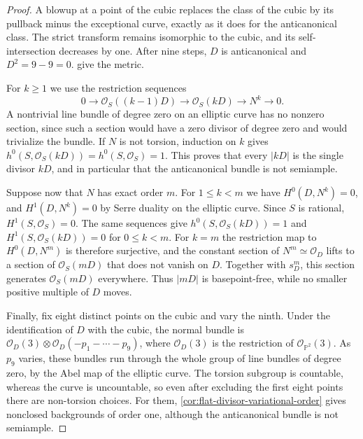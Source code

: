 \begin{proof}
A blowup at a point of the cubic replaces the class of the cubic by its pullback minus the exceptional curve, exactly as it does for the anticanonical class. The strict transform remains isomorphic to the cubic, and its self-intersection decreases by one. After nine steps, $D$ is anticanonical and $D^2=9-9=0$.  give the metric.

For $k\geq1$ we use the restriction sequences
\[
 0\longrightarrow\mathcal O_S((k-1)D)
 \longrightarrow\mathcal O_S(kD)
 \longrightarrow N^k\longrightarrow0.
\]
A nontrivial line bundle of degree zero on an elliptic curve has no nonzero section, since such a section would have a zero divisor of degree zero and would trivialize the bundle. If $N$ is not torsion, induction on $k$ gives $h^0(S,\mathcal O_S(kD))=h^0(S,\mathcal O_S)=1$. This proves that every $|kD|$ is the single divisor $kD$, and in particular that the anticanonical bundle is not semiample.

Suppose now that $N$ has exact order $m$. For $1\leq k<m$ we have $H^0(D,N^k)=0$, and $H^1(D,N^k)=0$ by Serre duality on the elliptic curve. Since $S$ is rational, $H^1(S,\mathcal O_S)=0$. The same sequences give $h^0(S,\mathcal O_S(kD))=1$ and $H^1(S,\mathcal O_S(kD))=0$ for $0\leq k<m$. For $k=m$ the restriction map to $H^0(D,N^m)$ is therefore surjective, and the constant section of $N^m\simeq\mathcal O_D$ lifts to a section of $\mathcal O_S(mD)$ that does not vanish on $D$. Together with $s_D^m$, this section generates $\mathcal O_S(mD)$ everywhere. Thus $|mD|$ is basepoint-free, while no smaller positive multiple of $D$ moves.

Finally, fix eight distinct points on the cubic and vary the ninth. Under the identification of $D$ with the cubic, the normal bundle is $\mathcal O_D(3)\otimes\mathcal O_D(-p_1-\cdots-p_9)$, where $\mathcal O_D(3)$ is the restriction of $\mathcal O_{\mathbb P^2}(3)$. As $p_9$ varies, these bundles run through the whole group of line bundles of degree zero, by the Abel map of the elliptic curve. The torsion subgroup is countable, whereas the curve is uncountable, so even after excluding the first eight points there are non-torsion choices. For them, \cref{cor:flat-divisor-variational-order} gives nonclosed backgrounds of order one, although the anticanonical bundle is not semiample.
\end{proof}
